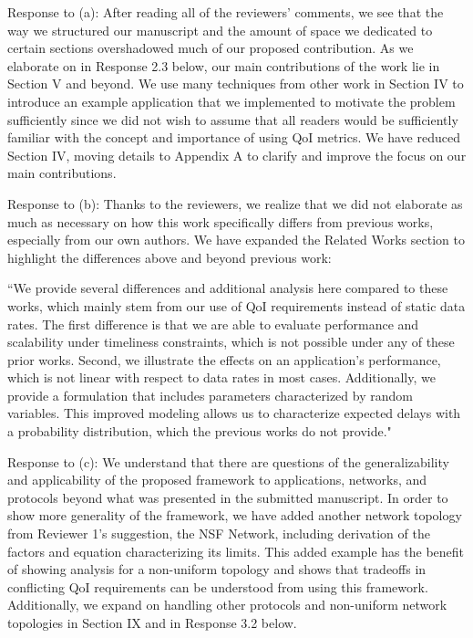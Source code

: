 \documentclass[12pt, letterpaper, onecolumn]{IEEEtran}
\begin{document}
{\color {blue}
Response to (a): After reading all of the reviewers' comments, we see that the way we structured our manuscript and the amount of space we dedicated to certain sections overshadowed much of our proposed contribution. As we elaborate on in Response 2.3 below, our main contributions of the work lie in Section V and beyond. We use many techniques from other work in Section IV to introduce an example application that we implemented to motivate the problem sufficiently since we did not wish to assume that all readers would be sufficiently familiar with the concept and importance of using QoI metrics. We have reduced Section IV, moving details to Appendix A to clarify and improve the focus on our main contributions. 

Response to (b): Thanks to the reviewers, we realize that we did not elaborate as much as necessary on how this work specifically differs from previous works, especially from our own authors. We have expanded the Related Works section to highlight the differences above and beyond previous work:

``We provide several differences and additional analysis here compared to these works, which mainly stem from our use of QoI requirements instead of static data rates. The first difference is that we are able to evaluate performance and scalability under timeliness constraints, which is not possible under any of these prior works. Second, we illustrate the effects on an application's performance, which is not linear with respect to data rates in most cases. Additionally, we provide a formulation that includes parameters characterized by random variables. This improved modeling allows us to characterize expected delays with a probability distribution, which the previous works do not provide."

Response to (c): We understand that there are questions of the generalizability and applicability of the proposed framework to applications, networks, and protocols beyond what was presented in the submitted manuscript. In order to show more generality of the framework, we have added another network topology from Reviewer 1's suggestion, the NSF Network, including derivation of the factors and equation characterizing its limits. This added example has the benefit of showing analysis for a non-uniform topology and shows that tradeoffs in conflicting QoI requirements can be understood from using this framework. Additionally, we expand on handling other protocols and non-uniform network topologies in Section IX and in Response 3.2 below.
}
\end{document}
